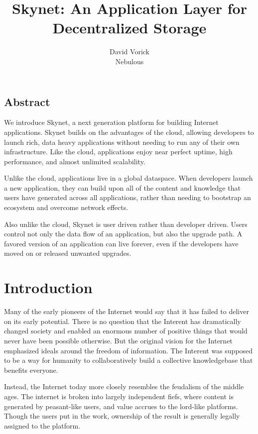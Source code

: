 \documentclass[twocolumn]{article}
\begin{document}
\frenchspacing

\title{Skynet: An Application Layer for Decentralized Storage}

\author{
{\rm David Vorick}\\
Nebulous\\
}

\maketitle

\subsection*{Abstract}
We introduce Skynet, a next generation platform for building Internet
applications. Skynet builds on the advantages of the cloud, allowing developers
to launch rich, data heavy applications without needing to run any of their own
infrastructure. Like the cloud, applications enjoy near perfect uptime, high
performance, and almost unlimited scalability.

Unlike the cloud, applications live in a global dataspace. When developers
launch a new application, they can build upon all of the content and knowledge
that users have generated across all applications, rather than needing to
bootstrap an ecosystem and overcome network effects.

Also unlike the cloud, Skynet is user driven rather than developer driven. Users
control not only the data flow of an application, but also the upgrade path. A
favored version of an application can live forever, even if the developers have
moved on or released unwanted upgrades.

\section{Introduction}
Many of the early pioneers of the Internet would say that it has failed to
deliver on its early potential. There is no question that the Interent has
dramatically changed society and enabled an enormous number of positive things
that would never have been possible otherwise. But the original vision for the
Internet emphasized ideals around the freedom of information. The Interent was
supposed to be a way for humanity to collaboratively build a collective
knowledgebase that benefits everyone.

Instead, the Internet today more closely resembles the feudalism of the middle
ages. The internet is broken into largely independent fiefs, where content is
generated by peasant-like users, and value accrues to the lord-like platforms.
Though the users put in the work, ownership of the result is generally legally
assigned to the platform.
\end{document}
